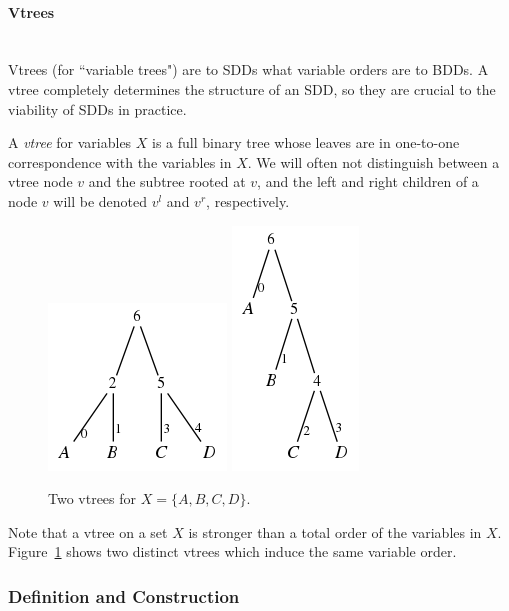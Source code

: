 \documentclass[11pt]{article}
\newenvironment{definition}[1][Definition]{\begin{trivlist}
\item[\hskip \labelsep {\bfseries #1}]}{\end{trivlist}}
\newcommand{\myparagraph}[1]{\paragraph{#1}\mbox{}\\}
\begin{document}
\myparagraph{Vtrees}

Vtrees (for ``variable trees") are to SDDs what variable orders are to BDDs. A vtree completely determines the structure of an SDD, so they are crucial to the viability of SDDs in practice.

\begin{definition}
A \textit{vtree} for variables $X$ is a full binary tree whose leaves are in one-to-one correspondence with the  variables in $X$. We will often not distinguish between a vtree node $v$ and the subtree rooted at $v$, and the left and right children of a node $v$ will be denoted $v^l$ and $v^r$, respectively.
\end{definition}

\begin{figure}
\centering
\includegraphics[scale=0.5]{balancedABCD.png}
\qquad
\includegraphics[scale=0.5]{rightlinearABCD.png}


\caption{Two vtrees for $X = \{A, B, C, D\}.$}
\label{fig:vtree_examples} 

\end{figure}
Note that a vtree on a set $X$ is stronger than a total order of the variables in $X$. Figure~\ref{fig:vtree_examples} shows two distinct vtrees which induce the same variable order. 

\subsubsection{Definition and Construction}
\end{document}
